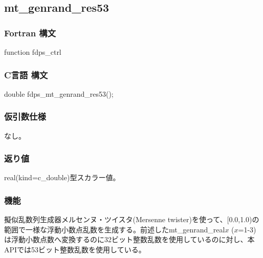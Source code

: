 \subsection{mt\_genrand\_res53}
\subsubsection*{Fortran 構文}
\begin{screen}
\begin{spverbatim}
function fdps_ctrl%
\end{spverbatim}
\end{screen}

\subsubsection*{C言語 構文}
\begin{screen}
\begin{spverbatim}
double fdps_mt_genrand_res53();
\end{spverbatim}
\end{screen}


\subsubsection*{仮引数仕様}
なし。

\subsubsection*{返り値}
real(kind=c\_double)型スカラー値。

\subsubsection*{機能}
擬似乱数列生成器メルセンヌ・ツイスタ(Mersenne twister)を使って、[0.0,1.0)の範囲で一様な浮動小数点乱数を生成する。前述したmt\_genrand\_real$x$ ($x$=1-3)は浮動小数点数へ変換するのに32ビット整数乱数を使用しているのに対し、本APIでは53ビット整数乱数を使用している。
\clearpage






